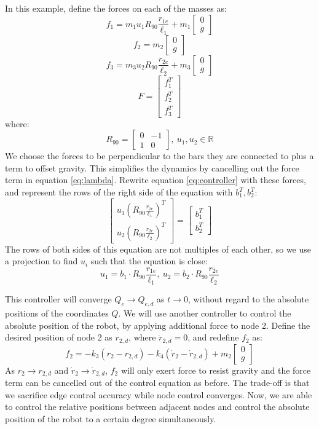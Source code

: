 \documentclass[conference]{IEEEtran}
\begin{document}
In this example, define the forces on each of the masses as:
$$f_1=m_1u_1R_{90}\frac{r_{1e}}{\ell_1} + m_1\begin{bmatrix} 0\\ g \end{bmatrix}$$
$$f_2=m_2\begin{bmatrix} 0\\ g \end{bmatrix}$$
$$f_3=m_3u_2R_{90}\frac{r_{2e}}{\ell_2} + m_3\begin{bmatrix} 0\\ g \end{bmatrix}$$
$$F=\begin{bmatrix}
    f_1^T\\ f_2^T\\ f_3^T
\end{bmatrix}$$
where:
$$R_{90}=\begin{bmatrix}
    0 & -1\\ 1 & 0
\end{bmatrix},\:u_1,u_2\in\mathbb{R}$$
We choose the forces to be perpendicular to the bars they are connected to plus a term to offset gravity. This simplifies the dynamics by cancelling out the force term in equation \ref{eq:lambda}. Rewrite equation \ref{eq:controller} with these forces, and represent the rows of the right side of the equation with $b_1^T,b_2^T$:
$$\begin{bmatrix}
    u_1(R_{90}\frac{r_{1e}}{\ell_1})^T\\
    u_2(R_{90}\frac{r_{2e}}{\ell_2})^T
\end{bmatrix}=\begin{bmatrix}
    b_1^T\\ b_2^T
\end{bmatrix}$$
The rows of both sides of this equation are not multiples of each other, so we use a projection to find $u_i$ such that the equation is close: 
$$u_1=b_1\cdot R_{90}\frac{r_{1e}}{\ell_1},\:u_2=b_2\cdot R_{90}\frac{r_{2e}}{\ell_2}$$

This controller will converge $Q_e\rightarrow Q_{e,d}$ as $t\rightarrow 0$, without regard to the absolute positions of the coordinates $Q$. We will use another controller to control the absolute position of the robot, by applying additional force to node 2. Define the desired position of node 2 as $r_{2,d}$, where $\ddot{r}_{2,d}=0$, and redefine $f_2$ as:
$$f_2=-k_3(r_2-r_{2,d}) - k_4(\dot{r}_2-\dot{r}_{2,d}) + m_2\begin{bmatrix} 0\\ g \end{bmatrix}$$
As $r_2\rightarrow r_{2,d}$ and $\dot{r}_2\rightarrow \dot{r}_{2,d}$, $f_2$ will only exert force to resist gravity and the force term can be cancelled out of the control equation as before. The trade-off is that we sacrifice edge control accuracy while node control converges. Now, we are able to control the relative positions between adjacent nodes and control the absolute position of the robot to a certain degree simultaneously.
\end{document}

